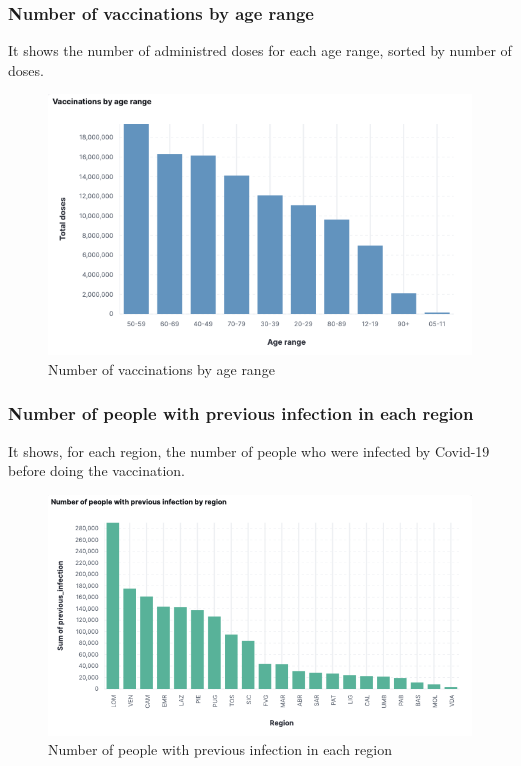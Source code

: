 \documentclass[12pt, a4paper]{article}
\begin{document}
\subsubsection{Number of vaccinations by age range}
It shows the number of administred doses for each age range, sorted by number of doses.
\begin{figure}[H]
  \centering
  \includegraphics[width=.85\linewidth]{img (15).png}
  \caption*{Number of vaccinations by age range}
\end{figure}

\subsubsection{Number of people with previous infection in each region}
It shows, for each region, the number of people who were infected by Covid-19 before 
doing the vaccination.
\begin{figure}[H]
  \centering
  \includegraphics[width=.9\linewidth]{img (16).png}
  \caption*{Number of people with previous infection in each region}
\end{figure}

\clearpage

\end{document}

